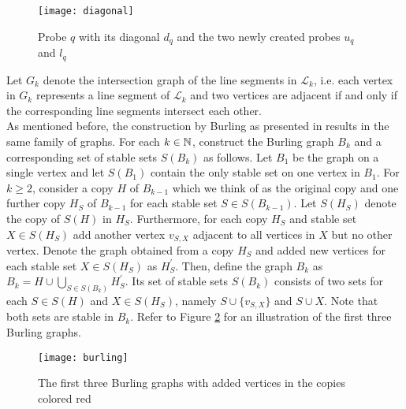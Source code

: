 \begin{figure}[ht]
\begin{center}
\texttt{[image: diagonal]}
\end{center}
\caption{Probe $q$ with its diagonal $d_q$ and the two newly created probes $u_q$ and $l_q$}
\label{f2ls}
\end{figure}
\newpage
Let $G_k$ denote the intersection graph of the line segments in $\mathcal{L}_k$, i.e. each vertex in $G_k$ represents a line segment of $\mathcal{L}_k$ and two vertices are adjacent if and only if the corresponding line segments intersect each other.\\

As mentioned before, the construction by Burling as presented in \cite{Fe18} results in the same family of graphs. For each $k\in\mathbb{N}$, construct the Burling graph $B_k$ and a corresponding set of stable sets $S(B_k)$ as follows. Let $B_1$ be the graph on a single vertex and let $S(B_1)$ contain the only stable set on one vertex in $B_1$. For $k\geq 2$, consider a copy $H$ of $B_{k-1}$ which we think of as the original copy and one further copy $H_S$ of $B_{k-1}$ for each stable set $S\in S(B_{k-1})$. Let $S(H_S)$ denote the copy of $S(H)$ in $H_S$. Furthermore, for each copy $H_S$ and stable set $X\in S(H_S)$ add another vertex $v_{S,X}$ adjacent to all vertices in $X$ but no other vertex. Denote the graph obtained from a copy $H_S$ and added new vertices for each stable set $X\in S(H_S)$ as $H_S^{\prime}$. Then, define the graph $B_k$ as $B_k=H\cup\bigcup_{S\in S(B_k)} H_S^{\prime}$. Its set of stable sets $S(B_k)$ consists of two sets for each $S\in S(H)$ and $X\in S(H_S)$, namely $S\cup \lbrace v_{S,X}\rbrace$ and $S\cup X$. Note that both sets are stable in $B_k$. Refer to Figure \ref{f4ls} for an illustration of the first three Burling graphs.

\begin{figure}[ht]
\begin{center}
\texttt{[image: burling]}
\end{center}
\caption{The first three Burling graphs with added vertices in the copies colored red}
\label{f4ls}
\end{figure}

